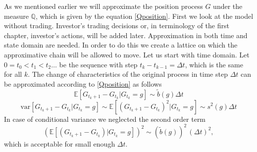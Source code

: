 As we mentioned earlier we will approximate the position process $G$ under the measure $\mathbb{Q}$, which is given by the equation \eqref{Qposition}. First we look at the model without trading. Investor's trading decisions or, in terminology of the first chapter, investor's actions, will be added later. Approximation in both time and state domain are needed. In order to do this we create a lattice on which the approximative chain will be allowed to move. Let us start with time domain. Let $0=t_0<t_1<t_2\dots$ be the sequence with step $t_k-t_{k-1}=\Delta t$, which is the same for all $k$. The change of characteristics of the original process in time step $\Delta t$ can be approximated according to \eqref{Qposition} as follows%
\begin{equation}
\label{EOrg}
\mathbb{E}[G_{t_k+1}-G_{t_k}|G_{t_k}=g]\sim \widetilde{b}(g) \Delta t
\end{equation}
\begin{equation}
\label{VarOrg}
\text{var}[G_{t_k+1}-G_{t_k}|G_{t_k}=g]\sim\mathbb{E}[(G_{t_k+1}-G_{t_k})^2|G_{t_k}=g]\sim s^{2}(g)\Delta t
\end{equation}
In case of conditional variance we neglected the second order term %
\[(\mathbb{E}[(G_{t_k+1}-G_{t_k})|G_{t_k}=g])^2\sim (\widetilde{b}(g))^2\,(\Delta t)^2,\]
which is acceptable for small enough $\Delta t$.


